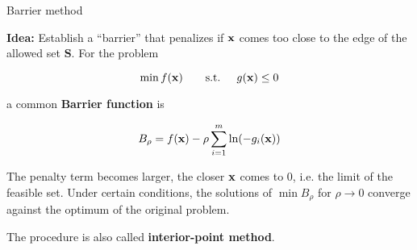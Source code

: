 \begin{vbframe}{Barrier method}

\textbf{Idea:} Establish a \enquote{barrier} that penalizes if $\mathbf{x}$ comes too close to the edge of the allowed set $\bm{S}$. For the problem

$$
\min f(\mathbf{x}) \qquad \text{s.t. } \quad g(\mathbf{x}) \le 0
$$

a common \textbf{Barrier function} is

$$
B_\rho = f(\mathbf{x}) - \rho \sum_{i = 1}^m \ln(-g_i(\mathbf{x}))
$$

The penalty term becomes larger, the closer $\mathbf{x}$ comes to $0$, i.e. the limit of the feasible set. Under certain conditions, the solutions of $\min B_\rho$ for $\rho\to 0$ converge against the optimum of the original problem.

\lz

The procedure is also called \textbf{interior-point method}.


\end{vbframe}










